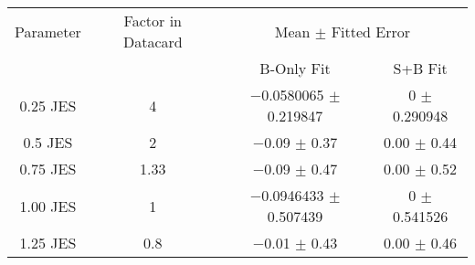 \begin{scriptsize}
\begin{table}
\centering
\begin{tabular}{cccc}
\toprule
Parameter & Factor in Datacard & \multicolumn{2}{c}{{Mean $\pm$ Fitted Error}}\\
 & & {B-Only Fit} & {S+B Fit}\\
\midrule
\num{0.25} JES & 4 & \num{-0.0580065} $\pm$ \num{0.219847} & \num{0} $\pm$ \num{0.290948}\\
\num{0.5} JES & 2 & \num{-0.09} $\pm$ \num{0.37} & \num{+0.00} $\pm$ \num{0.44}\\
\num{0.75} JES & \num{1.33} & \num{-0.09} $\pm$ \num{0.47} & \num{+0.00} $\pm$ \num{0.52}\\
\num{1.00} JES & 1 & \num{-0.0946433} $\pm$ \num{0.507439} & \num{0} $\pm$ \num{0.541526}\\
\num{1.25} JES & \num{0.8} & \num{-0.01} $\pm$ \num{0.43} & \num{+0.00} $\pm$ \num{0.46}\\
\bottomrule
\end{tabular}
\end{table}
\end{scriptsize}
